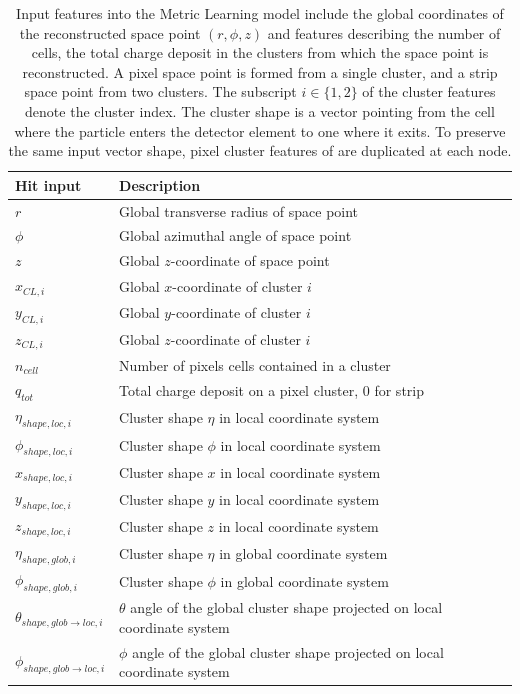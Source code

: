 \newpage
\begin{table}[h!]
    \centering
    \begin{tabular}{l|l}
    \hline
     Hit input    &  Description\\
     \hline \hline
      $r$   & Global transverse radius of space point \\
      $\phi$ & Global azimuthal angle of space point\\
      $z$ & Global $z$-coordinate of space point\\ \hline
      $x_{CL, i}$ & Global $x$-coordinate of cluster $i$ \\
      $y_{CL, i}$ & Global $y$-coordinate of cluster $i$ \\
      $z_{CL, i}$ & Global $z$-coordinate of cluster $i$ \\
      $n_{cell}$ & Number of pixels cells contained in a cluster \\
      $q_{tot}$ & Total charge deposit on a pixel cluster, 0 for strip \\
      $\eta_{shape,loc,i}$ & Cluster shape $\eta$ in local coordinate system \\
      $\phi_{shape,loc,i}$ & Cluster shape $\phi$ in local coordinate system \\
      $x_{shape,loc,i}$ & Cluster shape $x$ in local coordinate system \\
      $y_{shape,loc,i}$ & Cluster shape $y$ in local coordinate system \\
      $z_{shape,loc,i}$ & Cluster shape $z$ in local coordinate system \\
      $\eta_{shape,glob,i}$ & Cluster shape $\eta$ in global coordinate system \\
      $\phi_{shape,glob,i}$ & Cluster shape $\phi$ in global coordinate system \\
      $\theta_{shape,glob\to loc, i}$ & $\theta$ angle of the global cluster shape projected on local coordinate system \\
      $\phi_{shape,glob\to loc, i}$ & $\phi$ angle of the global cluster shape projected on local coordinate system \\
      \hline
    \end{tabular}
    \caption{Input features into the Metric Learning model include the global coordinates of the reconstructed space point $(r, \phi, z)$
     and features describing the number of cells, the total charge deposit in the clusters from which the space point is reconstructed.
     A pixel space point is formed from a single cluster, and a strip space point from two clusters. 
     The subscript $i\in \{1,2\}$ of the cluster features denote the cluster index.
     The cluster shape is a vector pointing from the cell where the particle enters the detector element to one where it exits.
     To preserve the same input vector shape, pixel cluster features of are duplicated at each node. }
    \label{tab:input-metric-learning}
\end{table}

